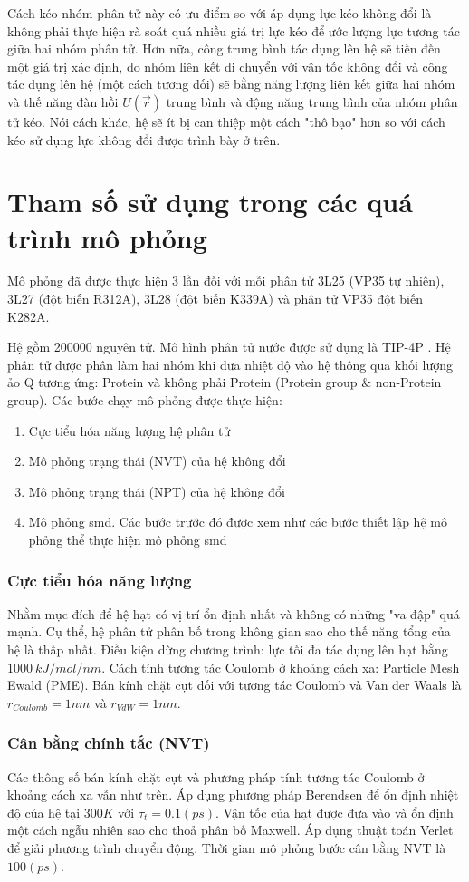 \documentclass[12pt,a4paper,reqno, oneside]{book}
\begin{document}
	Cách kéo nhóm phân tử này có ưu điểm so với áp dụng lực kéo không đổi là không phải thực hiện rà soát quá nhiều giá trị lực kéo để ước lượng lực tương tác giữa hai nhóm phân tử. Hơn nữa, công trung bình tác dụng lên hệ sẽ tiến đến một giá trị xác định, do nhóm liên kết di chuyển với vận tốc không đổi và công tác dụng lên hệ (một cách tương đối) sẽ bằng năng lượng liên kết giữa hai nhóm và thế năng đàn hồi $U\left( \vec{r}\right) $ trung bình và động năng trung bình của nhóm phân tử kéo. Nói cách khác, hệ sẽ ít bị can thiệp một cách "thô bạo" hơn so với cách kéo sử dụng lực không đổi được trình bày ở trên.
\section{Tham số sử dụng trong các quá trình mô phỏng}
Mô phỏng đã được thực hiện 3 lần đối với mỗi phân tử 3L25 (VP35 tự nhiên), 3L27 (đột biến \gls{R312A}), 3L28 (đột biến \gls{K339A}) và phân tử VP35 đột biến \gls{K282A}.

Hệ gồm 200000 nguyên tử. Mô hình phân tử nước được sử dụng là TIP-4P \cite{Horn2004}. Hệ phân tử được phân làm hai nhóm khi đưa nhiệt độ vào hệ thông qua khối lượng ảo Q tương ứng: Protein và không phải Protein (Protein group \& non-Protein group).
Các bước chạy mô phỏng được thực hiện:
\begin{enumerate}
\item Cực tiểu hóa năng lượng hệ phân tử
\item Mô phỏng trạng thái (NVT) của hệ không đổi
\item Mô phỏng trạng thái (NPT) của hệ không đổi
\item Mô phỏng \gls{smd}. Các bước trước đó được xem như các bước thiết lập hệ mô phỏng thể thực hiện mô phỏng \gls{smd}
\end{enumerate}
\subsubsection{Cực tiểu hóa năng lượng}
Nhằm mục đích để hệ hạt có vị trí ổn định nhất và không có những "va đập" quá mạnh. Cụ thể, hệ phân tử phân bố trong không gian sao cho thế năng tổng của hệ là thấp nhất. Điều kiện dừng chương trình: lực tối đa tác dụng lên hạt bằng $1000\ kJ/mol/nm$. Cách tính tương tác Coulomb ở khoảng cách xa: Particle Mesh Ewald (PME). Bán kính chặt cụt đối với tương tác Coulomb và Van der Waals là $r_{Coulomb}=1nm$ và $r_{VdW}=1nm$.
\label{rcutoff}
\subsubsection{Cân bằng chính tắc (NVT)}
Các thông số bán kính chặt cụt và phương pháp tính tương tác Coulomb ở khoảng cách xa vẫn như trên. Áp dụng phương pháp Berendsen để ổn định nhiệt độ của hệ tại $300K$ với $\tau_{t}=0.1\left(ps\right)$. Vận tốc của hạt được đưa vào và ổn định một cách ngẫu nhiên sao cho thoả phân bố Maxwell. Áp dụng thuật toán Verlet để giải phương trình chuyển động. Thời gian mô phỏng bước cân bằng NVT là $100\left(ps\right)$.
\end{document}
